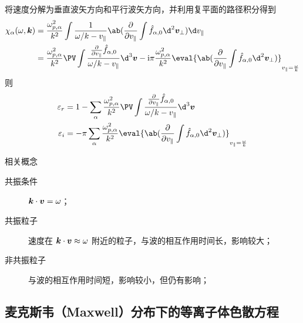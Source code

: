 将速度分解为垂直波矢方向和平行波矢方向，并利用复平面的路径积分得到
\begin{equation}\begin{aligned}
\chi_\alpha(\omega, \vector{k})
&= \frac{\omega_{p,\alpha}^2}{k^2} \int
    \frac{1}{\omega / k - v_\parallel}
    \ab( \pdv{}{v_\parallel}
        \int \hat{f}_{\alpha,0} \d^2 \vector{v}_\perp
    )
\d v_\parallel \\
&= \frac{\omega_{p,\alpha}^2}{k^2} \PV\int
    \frac{\pdv{}{v_\parallel} \hat{f}_{\alpha,0}}{\omega / k - v_\parallel}
\d^3 \vector{v}
- \im \pi \frac{\omega_{p,\alpha}^2}{k^2}
    \eval{\ab(\pdv{}{v_\parallel}
        \int \hat{f}_{\alpha,0} \d^2 \vector{v}_\perp
    )}_{v_\parallel = \frac{\omega}{k}}
\end{aligned}\end{equation}
则
\begin{subequations}\begin{align}
\varepsilon_r &= 1 - \sum_\alpha \frac{\omega_{p,\alpha}^2}{k^2} \PV \int
    \frac{\pdv{}{v_\parallel} \hat{f}_{\alpha,0}}{\omega / k - v_\parallel}
\d^3 \vector{v} \\
\varepsilon_i &= - \pi \sum_\alpha \frac{\omega_{p,\alpha}^2}{k^2}
    \eval{\ab(\pdv{}{v_\parallel}
        \int \hat{f}_{\alpha,0} \d^2 \vector{v}_\perp
    )}_{v_\parallel = \frac{\omega}{k}}
\end{align}\end{subequations}

相关概念
\begin{description}
    \item[共振条件] $\bm{k} \cdot \bm{v} = \omega$；
    \item[共振粒子] 速度在 $\bm{k} \cdot \bm{v} \approx \omega$ 附近的粒子，与波的相互作用时间长，影响较大；
    \item[非共振粒子] 与波的相互作用时间短，影响较小，但仍有影响；
\end{description}

\subsection{麦克斯韦（Maxwell）分布下的等离子体色散方程}

